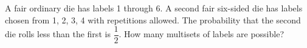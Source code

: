 A fair ordinary die has labels 1 through 6. A second fair six-sided die has labels chosen from 1, 2, 3, 4 with repetitions allowed. The probability that the second die rolls less than the first is $\dfrac{1}{2}$. How many multisets of labels are possible?
